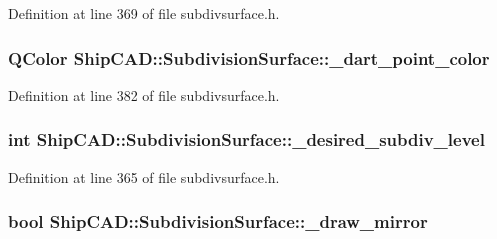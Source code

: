 Definition at line 369 of file subdivsurface.\-h.

\hypertarget{classShipCAD_1_1SubdivisionSurface_a45054fd2d0065a342828bcd675e91307}{
\subsubsection[{\-\_\-dart\-\_\-point\-\_\-color}]{\setlength{\rightskip}{0pt plus 5cm}Q\-Color Ship\-C\-A\-D\-::\-Subdivision\-Surface\-::\-\_\-dart\-\_\-point\-\_\-color\hspace{0.3cm}{\ttfamily [protected]}}}\label{classShipCAD_1_1SubdivisionSurface_a45054fd2d0065a342828bcd675e91307}


Definition at line 382 of file subdivsurface.\-h.

\hypertarget{classShipCAD_1_1SubdivisionSurface_aeec20f09be87e6d57d88f903853ca96f}{
\subsubsection[{\-\_\-desired\-\_\-subdiv\-\_\-level}]{\setlength{\rightskip}{0pt plus 5cm}int Ship\-C\-A\-D\-::\-Subdivision\-Surface\-::\-\_\-desired\-\_\-subdiv\-\_\-level\hspace{0.3cm}{\ttfamily [protected]}}}\label{classShipCAD_1_1SubdivisionSurface_aeec20f09be87e6d57d88f903853ca96f}


Definition at line 365 of file subdivsurface.\-h.

\hypertarget{classShipCAD_1_1SubdivisionSurface_a4ee73ae98bddfe1819419afd1d5ba029}{
\subsubsection[{\-\_\-draw\-\_\-mirror}]{\setlength{\rightskip}{0pt plus 5cm}bool Ship\-C\-A\-D\-::\-Subdivision\-Surface\-::\-\_\-draw\-\_\-mirror\hspace{0.3cm}{\ttfamily [protected]}}}\label{classShipCAD_1_1SubdivisionSurface_a4ee73ae98bddfe1819419afd1d5ba029}


